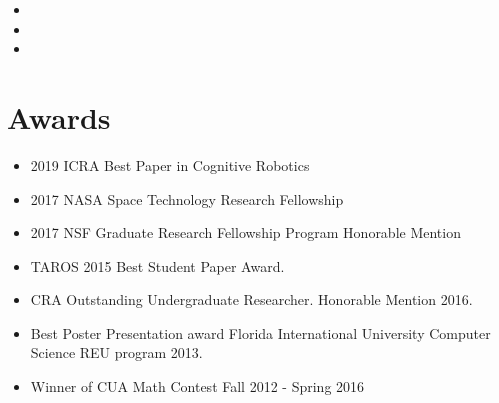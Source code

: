 \documentclass[11pt,a4paper,sans]{moderncv}        %
\begin{document}
\vspace{3pt}

\begin{itemize}

\item{}

\item{}  %
\item{}

\end{itemize}


\section{Awards}

\vspace{6pt}

\begin{itemize}

\item{2019 ICRA Best Paper in Cognitive Robotics}

\vspace{6pt}

\item{2017 NASA Space Technology Research Fellowship}

\vspace{6pt}

\item{2017 NSF Graduate Research Fellowship Program Honorable Mention}

\vspace{6pt}

\item{TAROS 2015 Best Student Paper Award.}

\vspace{6pt}

\item{CRA Outstanding Undergraduate Researcher.  Honorable Mention 2016.}

\vspace{6pt}

\item{Best Poster Presentation award Florida International University Computer Science REU program 2013.}

\vspace{6pt}

\item{Winner of CUA Math Contest Fall 2012 - Spring 2016}

\end{itemize}
\end{document}
